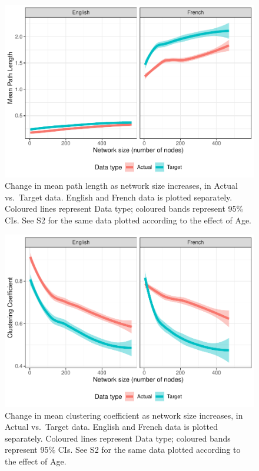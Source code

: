 \documentclass[
  man]{apa6}
\begin{document}
\begin{figure}
\centering
\includegraphics{NetworkGraphs_R2_files/figure-latex/Figure-path-length-DT-1.pdf}
\caption{\label{fig:Figure-path-length-DT}Change in mean path length as network size increases, in Actual vs.~Target data. English and French data is plotted separately. Coloured lines represent Data type; coloured bands represent 95\% CIs. See S2 for the same data plotted according to the effect of Age.}
\end{figure}

\begin{figure}
\centering
\includegraphics{NetworkGraphs_R2_files/figure-latex/Figure-clust-coef-DT-1.pdf}
\caption{\label{fig:Figure-clust-coef-DT}Change in mean clustering coefficient as network size increases, in Actual vs.~Target data. English and French data is plotted separately. Coloured lines represent Data type; coloured bands represent 95\% CIs. See S2 for the same data plotted according to the effect of Age.}
\end{figure}
\end{document}
